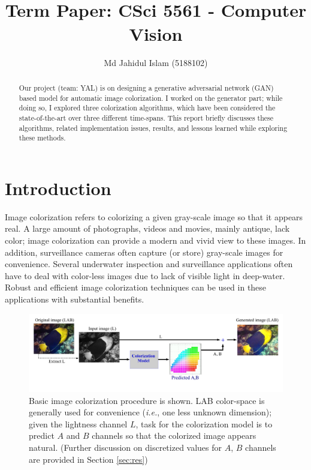 \documentclass[10pt]{article}
\title{\textbf{\doctitle}\\ \vspace{3mm}
Term Paper: CSci 5561 - Computer Vision}
\author{Md Jahidul Islam (5188102)}
\date{}
\begin{document}
\maketitle

\begin{abstract}
Our project (team: YAL) is on designing a generative adversarial network (GAN) based model for automatic image colorization. I worked on the generator part; while doing so, I explored three colorization algorithms, which have been considered the state-of-the-art over three different time-spans. This report briefly discusses these algorithms, related implementation issues, results, and lessons learned while exploring these methods.    
\end{abstract}

\section{Introduction}\label{sec:intro}
Image colorization \cite{zhang2016colorful, cheng2015deep, bugeau2014variational} refers to colorizing a given gray-scale image so that it appears real. 
A large amount of photographs, videos and movies, mainly antique, lack color; image colorization can provide a modern and vivid view to these images. In addition, surveillance cameras often capture (or store) gray-scale images for convenience. Several underwater inspection and surveillance applications \cite{lu2013underwater, torres2005color} often have to deal with color-less images due to lack of visible light in deep-water. Robust and efficient image colorization techniques can be used in these applications with substantial benefits.   

\begin{figure}[h]
\centering
\includegraphics[width=\linewidth]{Figs/6.pdf}
\vspace{-13mm}
\caption{Basic image colorization procedure is shown. LAB color-space is generally used for convenience (\textit{i.e.}, one less unknown dimension); given the lightness channel $L$, task for the colorization model is to predict $A$ and $B$ channels so that the colorized image appears natural. (Further discussion on discretized values for $A$, $B$ channels are provided in Section \ref{sec:res}) }
\label{fig:col}
\end{figure}  
\end{document}
